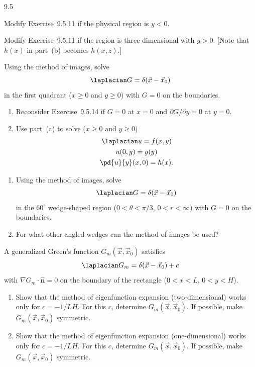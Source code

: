 \begin{exercises}{9.5}
\item Modify Exercise~9.5.11 if the physical region is $y < 0$.

\item[\starred 9.5.13.] Modify Exercise~9.5.11 if the region is three-dimensional with $y > 0$.  [Note that $h(x)$ in part~(b) becomes $h(x,z)$.]

\item[\starred 9.5.14.] Using the method of images, solve
\[
\laplacian G = \delta(\vec{x}-\vec{x}_0)
\]
in the first quadrant ($x \ge 0$ and $y \ge 0$) with $G = 0$ on the boundaries.

\item
\begin{enumerate}
\item[(a)] Reconsider Exercise~9.5.14 if $G = 0$ at $x = 0$ and $\partial G/\partial y = 0$ at $y = 0$.
\item[(b)] Use part~(a) to solve ($x \ge 0$ and $y \ge 0$)
\begin{gather*}
\laplacian u = f(x,y) \\
u(0,y) = g(y) \\
\pd{u}{y}(x,0) = h(x).
\end{gather*}
\end{enumerate}

\item
\begin{enumerate}
\item[(a)] Using the method of images, solve
\[
\laplacian G = \delta(\vec{x}-\vec{x}_0)
\]
in the $60^\circ$ wedge-shaped region ($0 < \theta < \pi/3$, $0 < r < \infty$) with $G = 0$ on the boundaries.
\item[(b)] For what other angled wedges can the method of images be used?
\end{enumerate}

\item A generalized Green's function $G_m(\vec{x},\vec{x}_0)$ satisfies
\[
\laplacian G_m = \delta(\vec{x}-\vec{x}_0) + c
\]
with $\nabla G_m \cdot\hat{\mathbf{n}} = 0$ on the boundary of the rectangle ($0 < x < L$, $0 < y < H$).
\begin{enumerate}
\item[(a)] Show that the method of eigenfunction expansion (two-dimensional) works only for $c = -1/LH$.  For this $c$, determine $G_m(\vec{x},\vec{x}_0)$.  If possible, make $G_m(\vec{x},\vec{x}_0)$ symmetric.
\item[(b)] Show that the method of eigenfunction expansion (one-dimensional) works only for $c = -1/LH$.  For this $c$, determine $G_m(\vec{x},\vec{x}_0)$.  If possible, make $G_m(\vec{x},\vec{x}_0)$ symmetric.
\end{enumerate}


\end{exercises}
